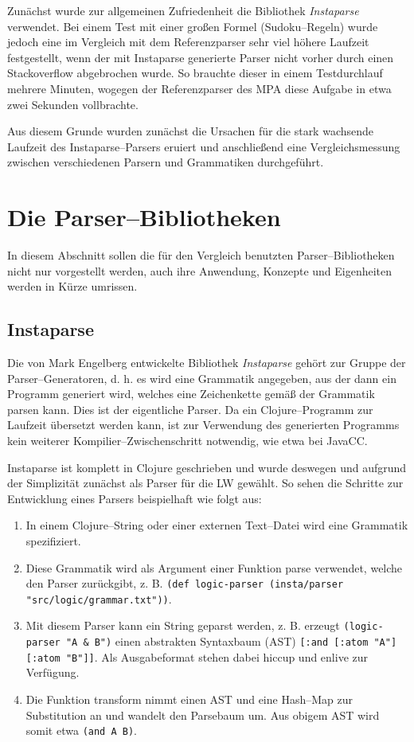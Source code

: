 \documentclass[ngerman,a4paper,abstracton,open=right,twoside=false,toc=listofnumbered,bibtotocnumbered]{scrreprt}
\begin{document}
Zunächst wurde zur allgemeinen Zufriedenheit die Bibliothek \emph{Instaparse} verwendet. Bei einem Test mit einer großen Formel (Sudoku--Regeln) wurde jedoch eine im Vergleich mit dem Referenzparser sehr viel höhere Laufzeit festgestellt, wenn der mit Instaparse generierte Parser nicht vorher durch einen Stackoverflow abgebrochen wurde. So brauchte dieser in einem Testdurchlauf mehrere Minuten, wogegen der Referenzparser des MPA diese Aufgabe in etwa zwei Sekunden vollbrachte.

Aus diesem Grunde wurden zunächst die Ursachen für die stark wachsende Laufzeit des Instaparse--Parsers eruiert und anschließend eine Vergleichsmessung zwischen verschiedenen Parsern und Grammatiken durchgeführt.

\section{Die Parser--Bibliotheken}

In diesem Abschnitt sollen die für den Vergleich benutzten Parser--Bibliotheken nicht nur vorgestellt werden, auch ihre Anwendung, Konzepte und Eigenheiten werden in Kürze umrissen.

\subsection{Instaparse}

Die von Mark Engelberg entwickelte Bibliothek \emph{Instaparse} gehört zur Gruppe der Parser--Generatoren, d. h. es wird eine Grammatik angegeben, aus der dann ein Programm generiert wird, welches eine Zeichenkette gemäß der Grammatik parsen kann. Dies ist der eigentliche Parser. Da ein Clojure--Programm zur Laufzeit übersetzt werden kann, ist zur Verwendung des generierten Programms kein weiterer Kompilier--Zwischenschritt notwendig, wie etwa bei JavaCC. \cite{instaparse}

Instaparse ist komplett in Clojure geschrieben und wurde deswegen und aufgrund der Simplizität zunächst als Parser für die LW gewählt. So sehen die Schritte zur Entwicklung eines Parsers beispielhaft wie folgt aus:

\begin{enumerate}
	\item In einem Clojure--String oder einer externen Text--Datei wird eine Grammatik spezifiziert.
	\item Diese Grammatik wird als Argument einer Funktion \glqq{}parse\grqq{} verwendet, welche den Parser zurückgibt, z. B. \lstinline|(def logic-parser (insta/parser "src/logic/grammar.txt"))|.
	\item Mit diesem Parser kann ein String geparst werden, z. B. erzeugt \lstinline|(logic-parser "A & B")| einen abstrakten Syntaxbaum (AST) \lstinline|[:and [:atom "A"] [:atom "B"]]|. Als Ausgabeformat stehen dabei hiccup und enlive zur Verfügung.
	\item Die Funktion \glqq{}transform\grqq{} nimmt einen AST und eine Hash--Map zur Substitution an und wandelt den Parsebaum um. Aus obigem AST wird somit etwa \lstinline|(and A B)|.
\end{enumerate}
\end{document}
